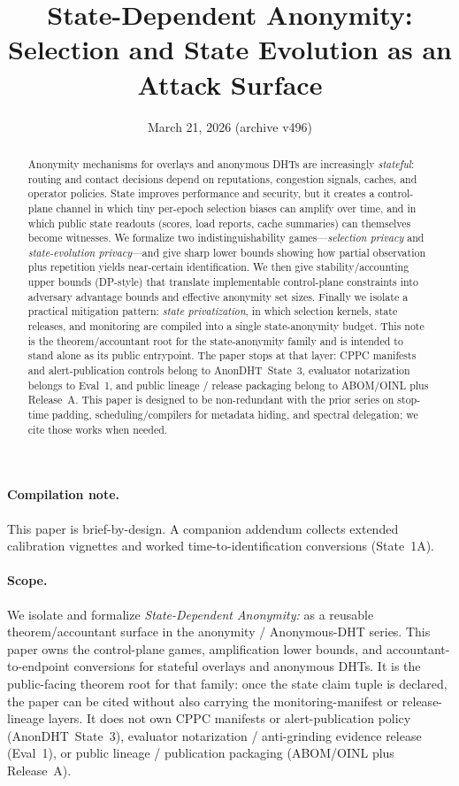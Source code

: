 \documentclass[11pt]{article}
\title{State-Dependent Anonymity:\\Selection and State Evolution as an Attack Surface}
\author{}
\date{March 21, 2026 (archive v496)}
\begin{document}
\maketitle

\begin{abstract}
Anonymity mechanisms for overlays and anonymous DHTs are increasingly \emph{stateful}:
routing and contact decisions depend on reputations, congestion signals, caches, and operator policies.
State improves performance and security, but it creates a control-plane channel in which tiny per-epoch
selection biases can amplify over time, and in which public state readouts (scores, load reports, cache
summaries) can themselves become witnesses.
We formalize two indistinguishability games---\emph{selection privacy} and \emph{state-evolution privacy}---and give sharp lower bounds
showing how partial observation plus repetition yields near-certain identification.
We then give stability/accounting upper bounds (DP-style) that translate implementable control-plane
constraints into adversary advantage bounds and effective anonymity set sizes.
Finally we isolate a practical mitigation pattern: \emph{state privatization}, in which
selection kernels, state releases, and monitoring are compiled into a single state-anonymity budget.
This note is the theorem/accountant root for the state-anonymity family and is intended to stand alone as its public entrypoint.
The paper stops at that layer: CPPC manifests and alert-publication controls belong to
AnonDHT~State~3, evaluator notarization belongs to Eval~1, and public lineage / release packaging belong to
ABOM/OINL plus Release~A. This paper is designed to be non-redundant with the prior series on stop-time padding,
scheduling/compilers for metadata hiding, and spectral delegation; we cite those works when needed.
\end{abstract}

\paragraph{Compilation note.}
This paper is brief-by-design. A companion addendum collects extended calibration vignettes and worked time-to-identification conversions (State~1A).\cite{series:state1addendum}

\paragraph{Scope.}
We isolate and formalize \emph{State-Dependent Anonymity:} as a reusable theorem/accountant surface in the anonymity / Anonymous-DHT series.
This paper owns the control-plane games, amplification lower bounds, and accountant-to-endpoint conversions for stateful overlays and anonymous DHTs.
It is the public-facing theorem root for that family: once the state claim tuple is declared, the paper can be cited without also carrying the monitoring-manifest or release-lineage layers.
It does not own CPPC manifests or alert-publication policy (AnonDHT~State~3), evaluator notarization / anti-grinding evidence release (Eval~1), or public lineage / publication packaging (ABOM/OINL plus Release~A).\cite{series:state3,series:evalnotary,series:release}
\end{document}
